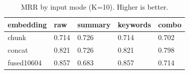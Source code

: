 \begin{table}
\caption{MRR by input mode (K=10). Higher is better.}
\label{tab:mrr-by-mode}
\begin{tabular}{lllll}
\toprule
embedding & raw & summary & keywords & combo \\
\midrule
chunk & 0.714 & 0.726 & 0.714 & 0.702 \\
concat & 0.821 & 0.726 & 0.821 & 0.798 \\
fused10604 & 0.857 & 0.683 & 0.857 & 0.714 \\
\bottomrule
\end{tabular}
\end{table}
